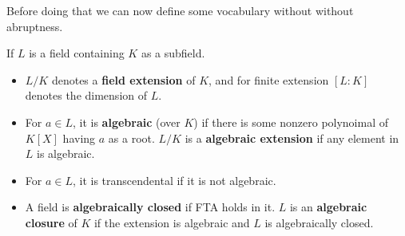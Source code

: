 \documentclass[en,geye,blue,normal,12pt]{elegantnote}
\begin{document}
Before doing that we can now define some vocabulary without without abruptness.
\begin{definition} 
  If \(L\) is a field containing \(K\) as a subfield.
  \begin{itemize}
    \item   \(L/K\) denotes a \textbf{field extension} of \(K\), and for finite extension \([L:K]\) denotes the dimension of \(L\).
    \item For \(a \in L \), it is \textbf{algebraic} (over \(K\)) if there is some nonzero polynoimal of \(K[X]\) having \(a\) as a root. \(L/K\) is a \textbf{algebraic extension} if any element in \(L\) is algebraic.
    \item For \(a \in L\), it is transcendental if it is not algebraic.
    \item A field is \textbf{algebraically closed} if FTA holds in it. \(L\) is an \textbf{algebraic closure} of \(K\) if the extension is algebraic and \(L\) is algebraically closed.
  \end{itemize}
\end{definition}
\end{document}
